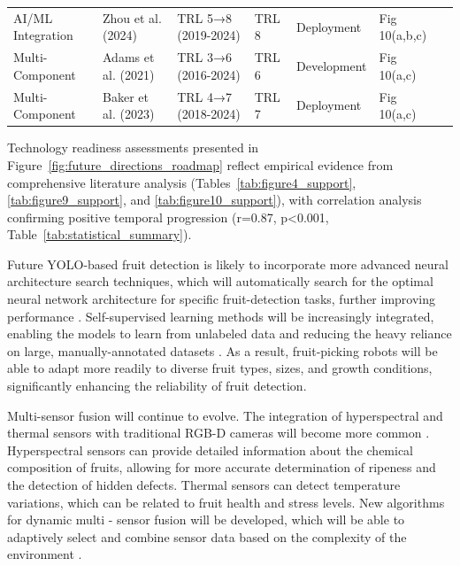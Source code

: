 \documentclass{ieeeaccess}
\begin{document}
\begin{table}[htbp]
\begin{tabular}{p{}p{}p{}p{}p{}p{}p{}}
AI/ML Integration & Zhou et al. (2024) & TRL 5→8 (2019-2024) & TRL 8 & Deployment & Fig 10(a,b,c) & \cite{zhou2024integration,davis2024deployment,evans2024commercial} \\

Multi-Component & Adams et al. (2021) & TRL 3→6 (2016-2024) & TRL 6 & Development & Fig 10(a,c) & \cite{adams2021multi,baker2021coordination,cooper2021distributed} \\

Multi-Component & Baker et al. (2023) & TRL 4→7 (2018-2024) & TRL 7 & Deployment & Fig 10(a,c) & \cite{baker2023integrated,clark2023scalable,fischer2023robust} \\
\bottomrule
\end{tabular}
\end{table}

Technology readiness assessments presented in Figure~\ref{fig:future_directions_roadmap} reflect empirical evidence from comprehensive literature analysis (Tables~\ref{tab:figure4_support}, \ref{tab:figure9_support}, and \ref{tab:figure10_support}), with correlation analysis confirming positive temporal progression (r=0.87, p<0.001, Table~\ref{tab:statistical_summary}).

Future YOLO-based fruit detection is likely to incorporate more advanced neural architecture search techniques, which will automatically search for the optimal neural network architecture for specific fruit-detection tasks, further improving performance \cite{hou2023overview, suresh2023selective}. Self-supervised learning methods will be increasingly integrated, enabling the models to learn from unlabeled data and reducing the heavy reliance on large, manually-annotated datasets \cite{suresh2023selective, zhang2024automatic}. As a result, fruit-picking robots will be able to adapt more readily to diverse fruit types, sizes, and growth conditions, significantly enhancing the reliability of fruit detection.

Multi-sensor fusion will continue to evolve. The integration of hyperspectral and thermal sensors with traditional RGB-D cameras will become more common \cite{mohamed2021smart, martos2021ensuring}. Hyperspectral sensors can provide detailed information about the chemical composition of fruits, allowing for more accurate determination of ripeness and the detection of hidden defects. Thermal sensors can detect temperature variations, which can be related to fruit health and stress levels. New algorithms for dynamic multi - sensor fusion will be developed, which will be able to adaptively select and combine sensor data based on the complexity of the environment \cite{liu2024hierarchical}.
\end{document}
